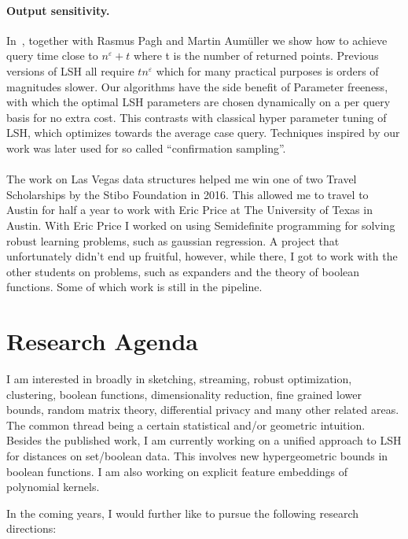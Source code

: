 \documentclass[10pt]{article}
\begin{document}
\paragraph{Output sensitivity.} In~\cite{ahle2017parameter}, together with Rasmus Pagh and Martin Aumüller we show how to achieve query time close to $n^\varepsilon + t$ where t is the number of returned points. Previous versions of LSH all require $t n^\varepsilon$ which for many practical purposes is orders of magnitudes slower. Our algorithms have the side benefit of Parameter freeness, with which the optimal LSH parameters are chosen dynamically on a per query basis for no extra cost. This contrasts with classical hyper parameter tuning of LSH, which optimizes towards the average case query. Techniques inspired by our work was later used for so called “confirmation sampling”.

\paragraph{}
The work on Las Vegas data structures helped me win one of two Travel Scholarships by the Stibo Foundation in 2016.
This allowed me to travel to Austin for half a year to work with Eric Price at The University of Texas in Austin.
With Eric Price I worked on using Semidefinite programming for solving robust learning problems, such as gaussian regression.
A project that unfortunately didn’t end up fruitful, however, while there, I got to work with the other students on problems, such as expanders and the theory of boolean functions.
Some of which work is still in the pipeline.

\section{Research Agenda}

I am interested in broadly in sketching, streaming, robust optimization, clustering, boolean functions, dimensionality reduction, fine grained lower bounds, random matrix theory, differential privacy and many other related areas.
The common thread being a certain statistical and/or geometric intuition.
Besides the published work, I am currently working on a unified approach to LSH for distances on set/boolean data. This involves new hypergeometric bounds in boolean functions. I am also working on explicit feature embeddings of polynomial kernels.

In the coming years, I would further like to pursue the following research directions:
\end{document}
